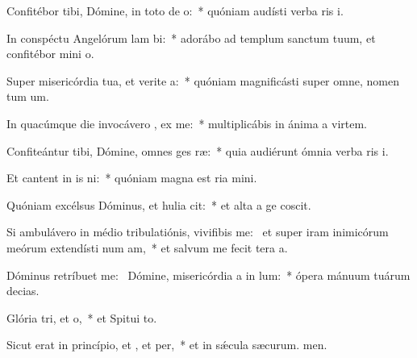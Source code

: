 \item Confitébor tibi, Dómine, in toto de o:~* quóniam audísti verba ris i.
\item In conspéctu Angelórum lam bi:~* adorábo ad templum sanctum tuum, et confitébor mini o.
\item Super misericórdia tua, et verite a:~* quóniam magnificásti super omne, nomen tum um.
\item In quacúmque die invocávero , ex me:~* multiplicábis in ánima a virtem.
\item Confiteántur tibi, Dómine, omnes ges ræ:~* quia audiérunt ómnia verba ris i.
\item Et cantent in is ni:~* quóniam magna est ria mini.
\item Quóniam excélsus Dóminus, et hulia cit:~* et alta a ge coscit.
\item Si ambulávero in médio tribulatiónis, vivifibis me:~\pscross{} et super iram inimicórum meórum extendísti num am,~* et salvum me fecit tera a.
\item Dóminus retríbuet  me:~\pscross{} Dómine, misericórdia a in lum:~* ópera mánuum tuárum  decias.
\item Glória tri, et o,~* et Spitui to.
\item Sicut erat in princípio, et , et per,~* et in sǽcula sæcurum. men.
